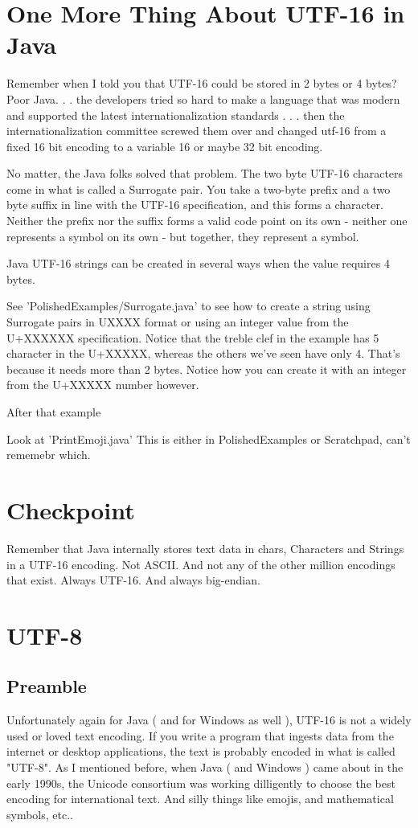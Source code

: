 \documentclass[12pt]{article}
\begin{document}
\section {One More Thing About UTF-16 in Java}
Remember when I told you that UTF-16 could be stored in 2 bytes or 4 bytes? Poor Java. . . the developers tried so hard to make a language that was modern and supported the latest internationalization standards . . . then the internationalization committee screwed them over and changed utf-16 from a fixed 16 bit encoding to a variable 16 or maybe 32 bit encoding. 

No matter, the Java folks solved that problem. The two byte UTF-16 characters come in what is called a Surrogate pair. You take a two-byte prefix and a two byte suffix in line with the UTF-16 specification, and this forms a character. Neither the prefix nor the suffix forms a valid code point on its own - neither one represents a symbol on its own - but together, they represent a symbol. 

Java UTF-16 strings can be created in several ways when the value requires 4 bytes.

See 'PolishedExamples/Surrogate.java' to see how to create a string using Surrogate pairs in UXXXX format or using an integer value from the U+XXXXXX specification. Notice that the treble clef in the example has 5 character in the U+XXXXX, whereas the others we've seen have only 4. That's because it needs more than 2 bytes. Notice how you can create it with an integer from the U+XXXXX number however.

After that example

Look at 'PrintEmoji.java' This is either in PolishedExamples or Scratchpad, can't rememebr which.

\section{ Checkpoint }
Remember that Java internally stores text data in chars, Characters and Strings in a UTF-16 encoding. Not ASCII. And not any of the other million encodings that exist. Always UTF-16. And always big-endian.

\section{UTF-8}
\subsection{Preamble}
Unfortunately again for Java ( and for Windows as well ), UTF-16 is not a widely used or loved text encoding. If you write a program that ingests data from the internet or desktop applications, the text is probably encoded in what is called "UTF-8". As I  mentioned before, when Java ( and Windows ) came about in the early 1990s, the Unicode consortium was working dilligently to choose the best encoding for international text. And silly things like emojis, and mathematical symbols, etc..
\end{document}
